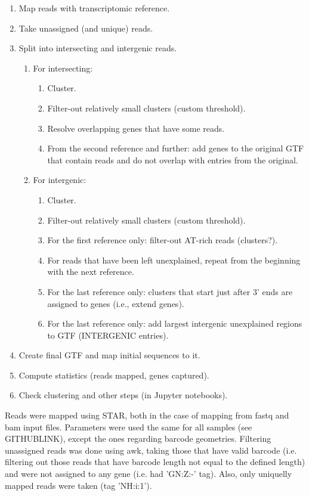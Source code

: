 \begin{enumerate}
    \item Map reads with transcriptomic reference.
    \item Take unassigned (and unique) reads.
    \item Split into intersecting and intergenic reads.
    \begin{enumerate}
        \item For intersecting:
        \begin{enumerate}
            \item Cluster.
            \item Filter-out relatively small clusters (custom threshold).
            \item Resolve overlapping genes that have some reads.
            \item From the second reference and further: add genes to the original GTF that contain reads and do not overlap with entries from the original.
        \end{enumerate}
        \item For intergenic:
        \begin{enumerate}
            \item Cluster.
            \item Filter-out relatively small clusters (custom threshold).
            \item For the first reference only: filter-out AT-rich reads (clusters?).
            \item For reads that have been left unexplained, repeat from the beginning with the next reference.
            \item For the last reference only: clusters that start just after 3' ends are assigned to genes (i.e., extend genes).
            \item For the last reference only: add largest intergenic unexplained regions to GTF (INTERGENIC entries).
        \end{enumerate}
    \end{enumerate}
    \item Create final GTF and map initial sequences to it.
    \item Compute statistics (reads mapped, genes captured).
    \item Check clustering and other steps (in Jupyter notebooks).
\end{enumerate}

Reads were mapped using STAR, both in the case of mapping from fastq and bam input files.
Parameters were used the same for all samples (see GITHUBLINK), except the ones regarding barcode geometries.
Filtering unassigned reads was done using awk, taking those that have valid barcode
(i.e. filtering out those reads that have barcode length not equal to the defined length)
and were not assigned to any gene (i.e. had 'GN:Z:-' tag).
Also, only uniquelly mapped reads were taken (tag 'NH:i:1').

